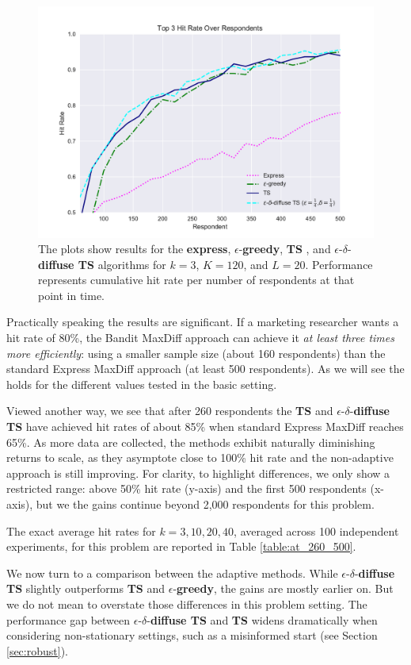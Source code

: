\documentclass[nonblindrev]{informs3}
\newcommand{\fixedexpress}{\textbf{express}}
\newcommand{\egreedy}{$\epsilon$-\textbf{greedy}}
\newcommand{\ts}{\textbf{TS} }
\newcommand{\edts}{$\epsilon$-$\delta$-\textbf{diffuse TS} }
\newcommand{\numperset}{L}
\begin{document}
\begin{figure}
\caption{The plots show results for the \fixedexpress, \egreedy, \ts, and \edts algorithms for $k=3$, $K=120$, and $\numperset=20$. Performance represents cumulative hit rate per number of respondents at that point in time.}
\label{fig:simple_result}
\begin{center}
	\includegraphics[width=.8\textwidth]{plots/hr120v20k3.pdf}
\end{center}
\end{figure}

Practically speaking the results are significant. If a marketing researcher wants a hit rate of 80\%, the Bandit MaxDiff approach can achieve it \emph{at least three times more efficiently}: using a smaller sample size (about 160 respondents) than the standard Express MaxDiff approach (at least 500 respondents). As we will see the  holds for the different values tested in the basic setting.
 
Viewed another way, we see that after 260 respondents the \ts and \edts have achieved hit rates of about 85\% when standard Express MaxDiff reaches 65\%. As more data are collected, the methods exhibit naturally diminishing returns to scale, as they asymptote close to 100\% hit rate and the non-adaptive approach is still improving. For clarity, to highlight differences, we only show a restricted range: above 50\% hit rate (y-axis) and the first 500 respondents (x-axis), but we the gains continue beyond 2,000 respondents for this problem. 

The exact average hit rates for $k=3,10,20,40$, averaged across 100 independent experiments, for this problem are reported in Table \ref{table:at_260_500}.

We now turn to a comparison between the adaptive methods. While \edts slightly outperforms \ts and \egreedy, the gains are mostly earlier on. But we do not mean to overstate those differences in this problem setting. The performance gap between \edts and \ts widens dramatically when considering non-stationary settings, such as a misinformed start (see Section \ref{sec:robust}). 
\end{document}
